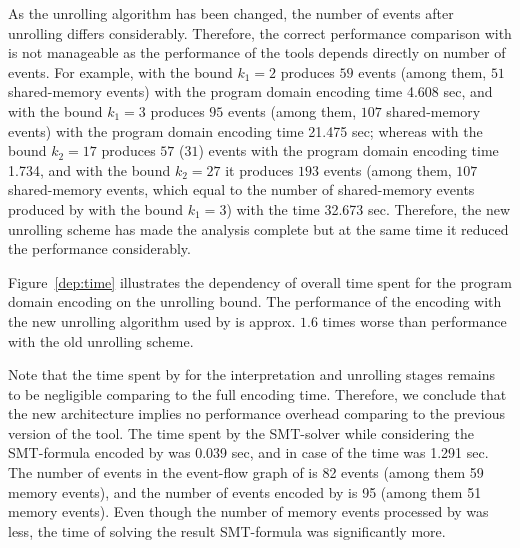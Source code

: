 As the unrolling algorithm has been changed, the number of events after unrolling differs considerably.
Therefore, the correct performance comparison with \porthos[1] is not manageable as the performance of the tools depends directly on number of events.
For example, with the bound $k_1=2$ \porthos[1] produces $59$ events (among them, $51$ shared-memory events) with the program domain encoding time 4.608 sec,
and with the bound $k_1=3$ \porthos[1] produces $95$ events (among them, $107$ shared-memory events) with the program domain encoding time 21.475 sec;
whereas \porthos[2] with the bound $k_2=17$ produces $57$ ($31$) events with the program domain encoding time 1.734, and with the bound $k_2=27$ it produces $193$ events (among them, $107$ shared-memory events, which equal to the number of shared-memory events produced by \porthos[1] with the bound $k_1=3$) with the time 32.673 sec.
Therefore, the new unrolling scheme has made the analysis complete but at the same time it reduced the performance considerably.


Figure~\ref{dep:time} illustrates the dependency of overall time spent for the program domain encoding on the unrolling bound.
The performance of the encoding with the new unrolling algorithm used by \porthos[2] is approx. $1.6$ times worse than performance with the old unrolling scheme.

Note that the time spent by \porthos[2] for the interpretation and unrolling stages remains to be negligible comparing to the full encoding time.
Therefore, we conclude that the new architecture implies no performance overhead comparing to the previous version of the tool.
The time spent by the SMT-solver while considering the SMT-formula encoded by \porthos[2] was 0.039 sec, and in case of \porthos[1] the time was 1.291 sec.
The number of events in the event-flow graph of \porthos[2] is 82 events (among them 59 memory events), and the number of events encoded by \porthos[1] is 95 (among them 51 memory events).
Even though the number of memory events processed by \porthos[1] was less, the time of solving the result SMT-formula was significantly more.

